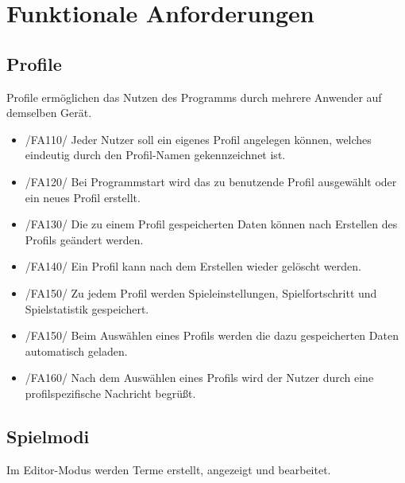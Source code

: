 \section{Funktionale Anforderungen}

\subsection{Profile}

Profile ermöglichen das Nutzen des Programms durch mehrere Anwender auf demselben Gerät.

\begin{itemize}
\item /FA110/ Jeder Nutzer soll ein eigenes Profil angelegen können, welches eindeutig durch den Profil-Namen gekennzeichnet ist. 
\item /FA120/ Bei Programmstart wird das zu benutzende Profil ausgewählt oder ein neues Profil erstellt.
\item /FA130/ Die zu einem Profil gespeicherten Daten können nach Erstellen des Profils geändert werden.
\item /FA140/ Ein Profil kann nach dem Erstellen wieder gelöscht werden.
\item /FA150/ Zu jedem Profil werden Spieleinstellungen, Spielfortschritt und Spielstatistik gespeichert.
\item /FA150/ Beim Auswählen eines Profils werden die dazu gespeicherten Daten automatisch geladen.
\item /FA160/ Nach dem Auswählen eines Profils wird der Nutzer durch eine profilspezifische Nachricht begrüßt.
\end{itemize}

\subsection{Spielmodi}

Im Editor-Modus werden Terme erstellt, angezeigt und bearbeitet.

